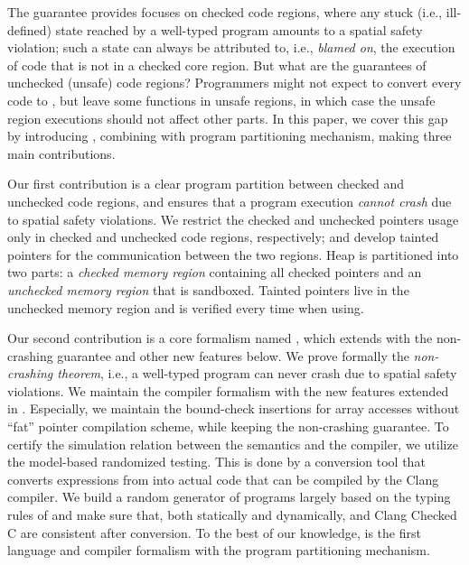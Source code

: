 The guarantee \checkedc provides focuses on checked code regions,
where any stuck (i.e., ill-defined)
state reached by a well-typed program amounts to a spatial safety
violation; such a state can always be attributed to, i.e., 
\emph{blamed on}, the execution of code that is not in a checked core
region. But what are the guarantees of unchecked (unsafe) code regions?
Programmers might not expect to convert every code to \checkedc,
but leave some functions in unsafe regions,
in which case the unsafe region executions should not affect other parts.
In this paper, we cover this gap by introducing \systemname,
combining \checkedc with program partitioning mechanism, 
making three main contributions.

Our first contribution is a clear program partition between checked and unchecked code regions,
and ensures that a \systemname program execution \textit{cannot crash} due to spatial safety violations.
We restrict the checked and unchecked pointers usage only in checked and unchecked code regions, respectively;
and develop tainted pointers for the communication between the two regions.
Heap is partitioned into two parts: a \textit{checked memory region} containing all checked pointers
 and an \textit{unchecked memory region} that is sandboxed.
Tainted pointers live in the unchecked memory region and is verified every time when using.


%
Our second contribution is a core formalism named \lang, which extends
\citet{li22checkedc} with the non-crashing guarantee and other new features below.
We prove formally the \textit{non-crashing theorem}, i.e., 
a well-typed \lang program can never crash due to spatial safety violations.
We maintain the compiler formalism with the new features extended in \systemname.
Especially, we maintain the bound-check insertions for array accesses 
without ``fat'' pointer compilation scheme, while keeping the non-crashing guarantee.
To certify the simulation relation between the \lang semantics and the compiler,
we utilize the model-based randomized testing.
This is done by a conversion tool that converts expressions from \lang into
actual \checkedc code that can be compiled by the Clang \checkedc
compiler. We build a random generator of programs largely based on the
typing rules of \lang and make sure that, both statically and
dynamically, \lang and Clang Checked C are consistent after
conversion.  
To the best of our knowledge, 
\lang is the first language and compiler formalism with the program partitioning mechanism.

